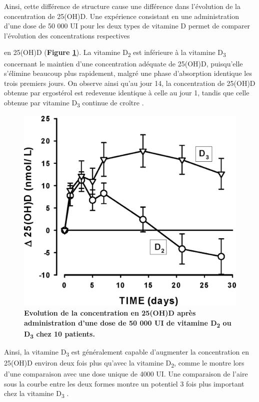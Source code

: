 \documentclass[
  a4paper,
  DIV=11,
  numbers=noendperiod,
  listof=totoc]{scrreprt}
\begin{document}
Ainsi, cette différence de structure cause une différence dans
l'évolution de la concentration de 25(OH)D. Une expérience consistant en
une administration d'une dose de 50 000 UI pour les deux types de
vitamine D permet de comparer l'évolution des concentrations respectives

en 25(OH)D (\textbf{Figure \ref{fig-PK}}). La vitamine
D\textsubscript{2} est inférieure à la vitamine D\textsubscript{3}
concernant le maintien d'une concentration adéquate de 25(OH)D,
puisqu'elle s'élimine beaucoup plus rapidement, malgré une phase
d'absorption identique les trois premiers jours. On observe ainsi qu'au
jour 14, la concentration de 25(OH)D obtenue par ergostérol est
redevenue identique à celle au jour 1, tandis que celle obtenue par
vitamine D\textsubscript{3} continue de croître \autocite{Armas.2004}.

\hypertarget{fig-PK}{%
\begin{figure}
\centering
\includegraphics{figures/PK_D2_vs_D3.jpeg}
\caption[{\textbf{Evolution de la concentration en 25(OH)D après
administration d'une dose de 50 000 UI de vitamine D\textsubscript{2} ou
D\textsubscript{3} chez 10 patients.}}]{\textbf{Evolution de la
concentration en 25(OH)D après administration d'une dose de 50 000 UI de
vitamine D\textsubscript{2} ou D\textsubscript{3} chez 10 patients.}
\autocite{Armas.2004}}
\label{fig-PK}
\end{figure}
}

Ainsi, la vitamine D\textsubscript{3} est généralement capable
d'augmenter la concentration en 25(OH)D environ deux fois plus qu'avec
la vitamine D\textsubscript{2}, comme le montre \textcite{Trang.1998}
lors d'une comparaison avec une dose unique de 4000 UI. Une comparaison
de l'aire sous la courbe entre les deux formes montre un potentiel 3
fois plus important chez la vitamine D\textsubscript{3}
\autocite{Armas.2004}.
\end{document}
